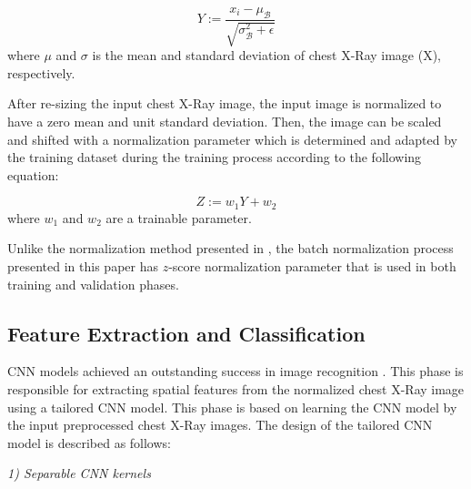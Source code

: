 \begin{equation}
Y := \frac{x_i - \mu_{\mathcal B}}{\sqrt{\sigma_{\mathcal B}^2 + \epsilon}}
\label{eq1}
\end{equation}
where $\mu$ and $\sigma$ is the mean  and standard deviation of chest X-Ray image (X), respectively.

After re-sizing the input chest X-Ray image, the input image is normalized to have a zero mean and unit standard deviation. Then,  the image can be scaled and shifted with a normalization parameter which is determined and adapted by the training dataset during the training process according to the following equation: 

\begin{equation}
Z := w_1 Y + w_2
\label{eq2}
\end{equation}
where $w_1$ and $w_2$ are a trainable parameter.

Unlike the  normalization method presented in \cite{ioffe2015batch}, the batch normalization process presented in this paper has $z$-score normalization parameter that is used in both training and validation phases.


\subsection{Feature Extraction and Classification}

CNN models achieved an outstanding success in image recognition \cite{lecun2015deep}. This phase  is responsible for extracting spatial features from the normalized chest X-Ray image using a tailored CNN model.  This phase is based on learning the CNN model by the input preprocessed chest X-Ray images. The design of the tailored CNN model is described as follows: 

\textit{1) Separable CNN kernels}

